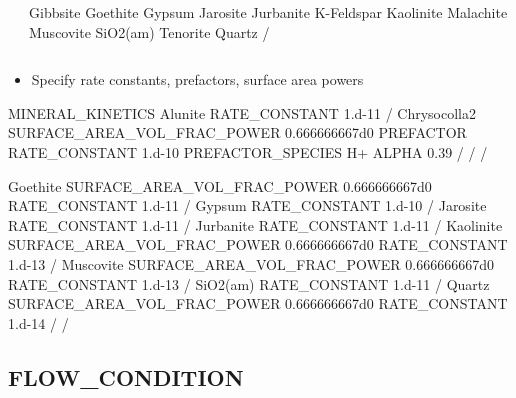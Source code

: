 \documentclass{beamer}
\begin{document}
\begin{frame}
\begin{columns}[c]
\begin{semiverbatim}
\end{semiverbatim}
\begin{semiverbatim}
    Gibbsite
    Goethite
    Gypsum
    Jarosite
    Jurbanite
    K-Feldspar
    Kaolinite
    Malachite
    Muscovite
    SiO2(am)
    Tenorite
    Quartz
  /
\end{semiverbatim}
  \end{columns}

  \newpage
  \begin{itemize}
  \item Specify rate constants, prefactors, surface area powers
  \end{itemize}
\begin{semiverbatim}
  MINERAL_KINETICS
    Alunite
      RATE_CONSTANT 1.d-11
    /
    Chrysocolla2
      SURFACE_AREA_VOL_FRAC_POWER 0.666666667d0
      PREFACTOR
        RATE_CONSTANT 1.d-10
        PREFACTOR_SPECIES H+
          ALPHA 0.39
        /
      /
    /
    
    
    Goethite
      SURFACE_AREA_VOL_FRAC_POWER 0.666666667d0
      RATE_CONSTANT 1.d-11
    /
    Gypsum
      RATE_CONSTANT 1.d-10
    /
    Jarosite
      RATE_CONSTANT 1.d-11
    /
    Jurbanite
      RATE_CONSTANT 1.d-11
    /
    Kaolinite
      SURFACE_AREA_VOL_FRAC_POWER 0.666666667d0
      RATE_CONSTANT 1.d-13
    /
    Muscovite
      SURFACE_AREA_VOL_FRAC_POWER 0.666666667d0
      RATE_CONSTANT 1.d-13
    /
    SiO2(am)
      RATE_CONSTANT 1.d-11
    /
    Quartz
      SURFACE_AREA_VOL_FRAC_POWER 0.666666667d0
      RATE_CONSTANT 1.d-14
    /
  /
\end{semiverbatim}

\end{frame}

\subsection{FLOW\_CONDITION}
\end{document}
